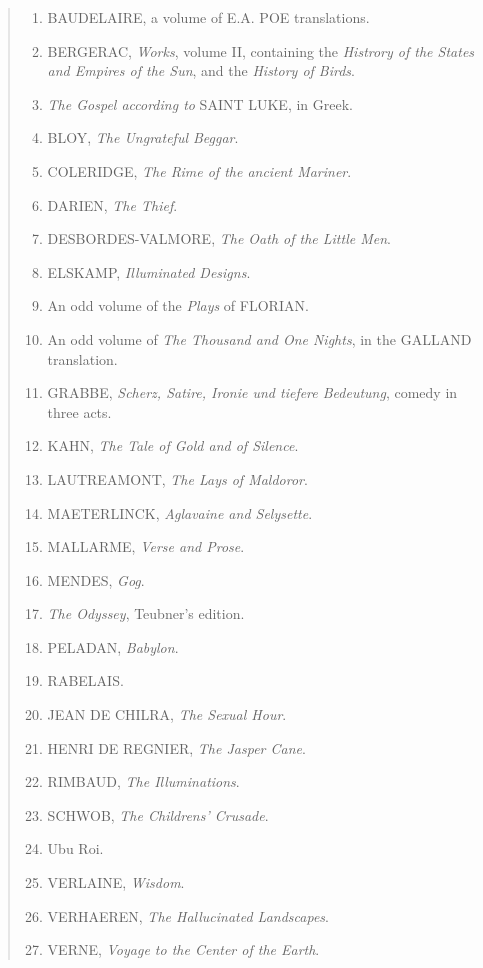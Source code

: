 \begin{quotation}
  \begin{enumerate}
    \item BAUDELAIRE, a volume of E.A. POE translations.
    \item BERGERAC, \emph{Works}, volume II, containing the \emph{Histrory of the States and Empires of the Sun}, and the \emph{History of Birds}.
    \item \emph{The Gospel according to} SAINT LUKE, in Greek.
    \item BLOY, \emph{The Ungrateful Beggar}.
    \item COLERIDGE, \emph{The Rime of the ancient Mariner}.
    \item DARIEN, \emph{The Thief}.
    \item DESBORDES-VALMORE, \emph{The Oath of the Little Men}.
    \item ELSKAMP, \emph{Illuminated Designs}.
    \item An odd volume of the \emph{Plays} of FLORIAN\@.
    \item An odd volume of \emph{The Thousand and One Nights}, in the GALLAND translation.
    \item GRABBE, \emph{Scherz, Satire, Ironie und tiefere Bedeutung}, comedy in three acts.
    \item KAHN, \emph{The Tale of Gold and of Silence}.
    \item LAUTREAMONT, \emph{The Lays of Maldoror}.
    \item MAETERLINCK, \emph{Aglavaine and Selysette}.
    \item MALLARME, \emph{Verse and Prose}.
    \item MENDES, \emph{Gog}.
    \item \emph{The Odyssey}, Teubner's edition.
    \item PELADAN, \emph{Babylon}.
    \item RABELAIS\@.
    \item JEAN DE CHILRA, \emph{The Sexual Hour}.
    \item HENRI DE REGNIER, \emph{The Jasper Cane}.
    \item RIMBAUD, \emph{The Illuminations}.
    \item SCHWOB, \emph{The Childrens' Crusade}.
    \item Ubu Roi.
    \item VERLAINE, \emph{Wisdom}.
    \item VERHAEREN, \emph{The Hallucinated Landscapes}.
    \item VERNE, \emph{Voyage to the Center of the Earth}.
  \end{enumerate}
\end{quotation}

